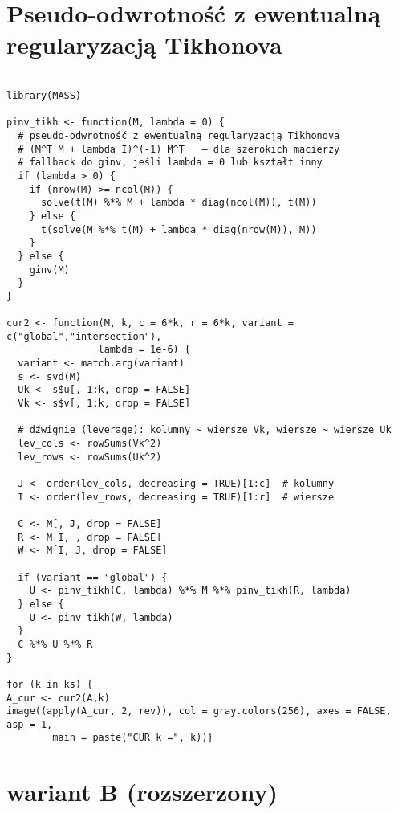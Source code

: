 \documentclass[12pt]{article}
\begin{document}
\section{Pseudo-odwrotność z ewentualną regularyzacją Tikhonova} 
\begin{verbatim}

library(MASS)

pinv_tikh <- function(M, lambda = 0) {
  # pseudo-odwrotność z ewentualną regularyzacją Tikhonova
  # (M^T M + lambda I)^(-1) M^T   — dla szerokich macierzy
  # fallback do ginv, jeśli lambda = 0 lub kształt inny
  if (lambda > 0) {
    if (nrow(M) >= ncol(M)) {
      solve(t(M) %*% M + lambda * diag(ncol(M)), t(M))
    } else {
      t(solve(M %*% t(M) + lambda * diag(nrow(M)), M))
    }
  } else {
    ginv(M)
  }
}

cur2 <- function(M, k, c = 6*k, r = 6*k, variant = c("global","intersection"),
                lambda = 1e-6) {
  variant <- match.arg(variant)
  s <- svd(M)
  Uk <- s$u[, 1:k, drop = FALSE]
  Vk <- s$v[, 1:k, drop = FALSE]

  # dźwignie (leverage): kolumny ~ wiersze Vk, wiersze ~ wiersze Uk
  lev_cols <- rowSums(Vk^2)
  lev_rows <- rowSums(Uk^2)

  J <- order(lev_cols, decreasing = TRUE)[1:c]  # kolumny
  I <- order(lev_rows, decreasing = TRUE)[1:r]  # wiersze

  C <- M[, J, drop = FALSE]
  R <- M[I, , drop = FALSE]
  W <- M[I, J, drop = FALSE]

  if (variant == "global") {
    U <- pinv_tikh(C, lambda) %*% M %*% pinv_tikh(R, lambda)
  } else {
    U <- pinv_tikh(W, lambda)
  }
  C %*% U %*% R
}

for (k in ks) {
A_cur <- cur2(A,k)
image((apply(A_cur, 2, rev)), col = gray.colors(256), axes = FALSE, asp = 1,
        main = paste("CUR k =", k))}

\end{verbatim}

\section{wariant B (rozszerzony)}
\end{document}
